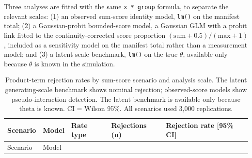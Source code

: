 \documentclass[
  man,
  floatsintext,
  longtable,
  nolmodern,
  notxfonts,
  notimes,
  colorlinks=true,linkcolor=blue,citecolor=blue,urlcolor=blue]{apa7}
\begin{document}
Three analyses are fitted with the same \texttt{x\ *\ group} formula, to
separate the relevant scales: (1) an observed sum-score identity model,
\texttt{lm()} on the manifest total; (2) a Gaussian-probit bounded-score
model, a Gaussian GLM with a probit link fitted to the
continuity-corrected score proportion
\((\text{sum} + 0.5) / (\text{max} + 1)\), included as a sensitivity
model on the manifest total rather than a measurement model; and (3) a
latent-scale benchmark, \texttt{lm()} on the true \(\theta\), available
only because \(\theta\) is known in the simulation.

\begin{longtable}[]{@{}
  >{\raggedright\arraybackslash}p{}
  >{\raggedright\arraybackslash}p{}
  >{\raggedright\arraybackslash}p{}
  >{\raggedleft\arraybackslash}p{}
  >{\raggedright\arraybackslash}p{}@{}}
\caption{Product-term rejection rates by sum-score scenario and analysis
scale. The latent generating-scale benchmark shows nominal rejection;
observed-score models show pseudo-interaction detection. The latent
benchmark is available only because theta is known. CI = Wilson 95\%.
All scenarios used 3,000
replications.}\label{tbl-rejection-sum-score}\tabularnewline
\toprule\noalign{}
\begin{minipage}[b]{\linewidth}\raggedright
Scenario
\end{minipage} & \begin{minipage}[b]{\linewidth}\raggedright
Model
\end{minipage} & \begin{minipage}[b]{\linewidth}\raggedright
Rate type
\end{minipage} & \begin{minipage}[b]{\linewidth}\raggedleft
Rejections (n)
\end{minipage} & \begin{minipage}[b]{\linewidth}\raggedright
Rejection rate {[}95\% CI{]}
\end{minipage} \\
\midrule\noalign{}
\endfirsthead
\toprule\noalign{}
\begin{minipage}[b]{\linewidth}\raggedright
Scenario
\end{minipage} & \begin{minipage}[b]{\linewidth}\raggedright
Model
\end{minipage} & \begin{minipage}[b]{\linewidth}\raggedright

\end{minipage}
\end{longtable}
\end{document}
